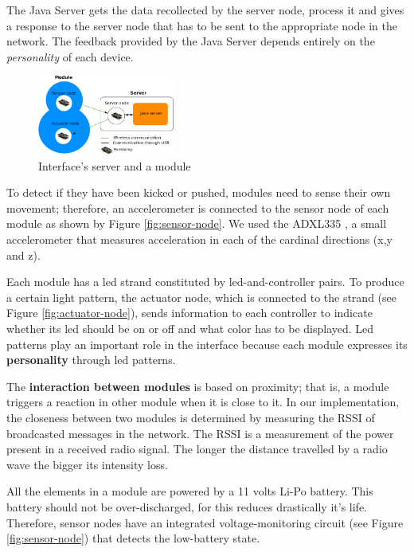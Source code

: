 The Java Server gets the data recollected by the server node, process it and gives a response to the server node that has to be sent to the appropriate node in the network. The feedback provided by the Java Server depends entirely on the \emph{personality} of each device.

\begin{figure}[h!]
 \centering
 \includegraphics[width= 0.4\textwidth, clip=true  ,keepaspectratio=true]{./graph/entity_server.png}
 \caption{Interface's server and a module}
 \label{fig:server-module}
\end{figure}

To detect if they have been kicked or pushed, modules need to sense their own movement; therefore, an accelerometer is connected to the sensor node of each module as shown by Figure \ref{fig:sensor-node}. We used the ADXL335 \cite{ADXL335}, a small accelerometer that measures acceleration in each of the cardinal directions (x,y and z).

Each module has a led strand constituted by led-and-controller pairs. To produce a certain light pattern, the actuator node, which is connected to the strand (see Figure \ref{fig:actuator-node}), sends information to each controller to indicate whether its led should be on or off and what color has to be displayed. Led patterns play an important role in the interface because each module expresses its \textbf{personality} through led patterns.  

The \textbf{interaction between modules} is based on proximity; that is, a module triggers a reaction in other module when it is close to it. In our implementation, the closeness between two modules is determined by measuring the RSSI of broadcasted messages in the network. The RSSI is a measurement of the power present in a received radio signal. The longer the distance travelled by a radio wave the bigger its intensity loss.

All the elements in a module are powered by a 11 volts Li-Po battery. This battery should not be over-discharged, for this reduces drastically it's life. Therefore, sensor nodes have an integrated voltage-monitoring circuit (see Figure \ref{fig:sensor-node}) that detects the  low-battery state.

